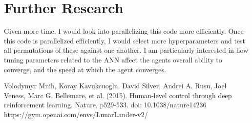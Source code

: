 \documentclass[conference]{IEEEtran}
\begin{document}
\section{Further Research}
Given more time, I would look into parallelizing this code more efficiently. Once this code is parallelized efficiently, I would select more hyperparameters and test all permutations of these against one another. I am particularly interested in how tuning parameters related to the ANN affect the agents overall ability to converge, and the speed at which the agent converges.

\begin{thebibliography}{00}
 Volodymyr Mnih, Koray Kavukcuoglu, David Silver, Andrei A. Rusu, Joel Veness, Marc G. Bellemare, et al. (2015). Human-level control through deep reinforcement learning. Nature, p529-533. doi: 10.1038/nature14236
 https://gym.openai.com/envs/LunarLander-v2/
\end{thebibliography}
\end{document}
